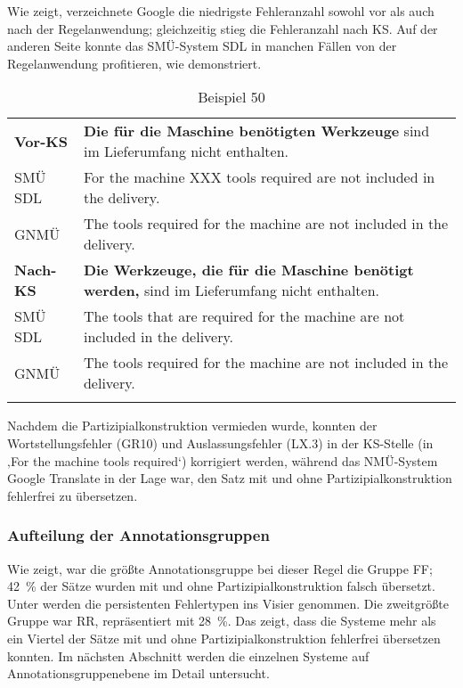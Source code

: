 Wie  zeigt, verzeichnete Google die niedrigste Fehleranzahl sowohl vor als auch nach der Regelanwendung; gleichzeitig stieg die Fehleranzahl nach KS. Auf der anderen Seite konnte das SMÜ-System SDL in manchen Fällen von der Regelanwendung profitieren, wie  demonstriert.


\begin{table}
\begin{tabularx}{\textwidth}{lX}

\lsptoprule

\textbf{Vor-KS} & \textbf{Die für die Maschine benötigten Werkzeuge} sind im Lieferumfang nicht enthalten.\\
\tablevspace
SMÜ SDL & \textcolor{lsRed}{For the machine XXX tools required} are not included in the delivery.\\
GNMÜ & \textcolor{tmnlpthree}{The tools required for the machine} are not included in the delivery. \\
\midrule
\textbf{Nach-KS} & \textbf{Die Werkzeuge, die für die Maschine benötigt werden,} sind im Lieferumfang nicht enthalten.\\
\tablevspace
SMÜ SDL & \textcolor{tmnlpthree}{The tools that are required for the machine} are not included in the delivery.\\
GNMÜ & \textcolor{tmnlpthree}{The tools required for the machine} are not included in the delivery. \\
\lspbottomrule
\end{tabularx}\caption{\label{tabex:05:50}Beispiel 50   }
\end{table}

Nachdem die Partizipialkonstruktion vermieden wurde, konnten der Wortstellungsfehler (GR10) und Auslassungsfehler (LX.3) in der KS-Stelle (in ‚For the machine tools required‘) korrigiert werden, während das NMÜ-System Google Translate in der Lage war, den Satz mit und ohne Partizipialkonstruktion fehlerfrei zu übersetzen.

\subsubsection{\label{sec:5.3.5.2}Aufteilung der Annotationsgruppen}

Wie  zeigt, war die größte Annotationsgruppe bei dieser Regel die Gruppe FF; 42~\% der Sätze wurden mit und ohne Partizipialkonstruktion falsch übersetzt.  Unter  werden die persistenten Fehlertypen ins Visier genommen. Die zweitgrößte Gruppe war RR, repräsentiert mit 28~\%. Das zeigt, dass die Systeme mehr als ein Viertel der Sätze mit und ohne Partizipialkonstruktion fehlerfrei übersetzen konnten. Im nächsten Abschnitt werden die einzelnen Systeme auf Annotationsgruppenebene im Detail untersucht.


